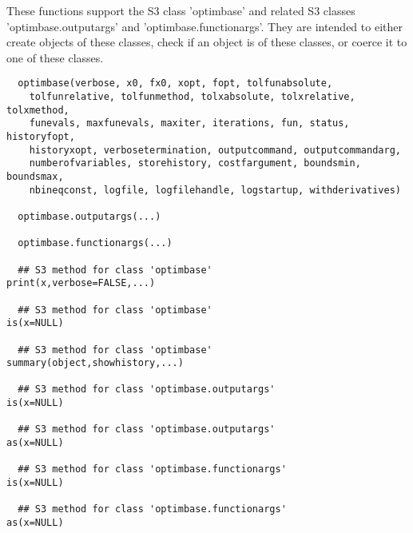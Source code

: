 %
\begin{Description}\relax
These functions support the S3 class 'optimbase' and related S3 classes 
'optimbase.outputargs' and 'optimbase.functionargs'. They are intended to 
either create objects of these classes, check if an object is of these classes, 
or coerce it to one of these classes.
\end{Description}
%
\begin{Usage}
\begin{verbatim}
  optimbase(verbose, x0, fx0, xopt, fopt, tolfunabsolute, 
    tolfunrelative, tolfunmethod, tolxabsolute, tolxrelative, tolxmethod, 
    funevals, maxfunevals, maxiter, iterations, fun, status, historyfopt,
    historyxopt, verbosetermination, outputcommand, outputcommandarg,
    numberofvariables, storehistory, costfargument, boundsmin, boundsmax,
    nbineqconst, logfile, logfilehandle, logstartup, withderivatives)
  
  optimbase.outputargs(...)
  
  optimbase.functionargs(...)
  
  ## S3 method for class 'optimbase'
print(x,verbose=FALSE,...)
  
  ## S3 method for class 'optimbase'
is(x=NULL)
  
  ## S3 method for class 'optimbase'
summary(object,showhistory,...)
  
  ## S3 method for class 'optimbase.outputargs'
is(x=NULL)
  
  ## S3 method for class 'optimbase.outputargs'
as(x=NULL)
  
  ## S3 method for class 'optimbase.functionargs'
is(x=NULL)
  
  ## S3 method for class 'optimbase.functionargs'
as(x=NULL)
  
\end{verbatim}
\end{Usage}
